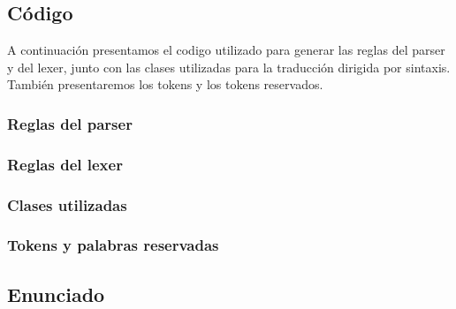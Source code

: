 \subsection{Código}
A continuación presentamos el codigo utilizado para generar las reglas del
parser y del lexer, junto con las clases utilizadas para
la traducción dirigida por sintaxis. También presentaremos los tokens y los
tokens reservados.
\subsubsection{Reglas del parser}


\subsubsection{Reglas del lexer}


\subsubsection{Clases utilizadas}


\subsubsection{Tokens y palabras reservadas}





\subsection{Enunciado}

